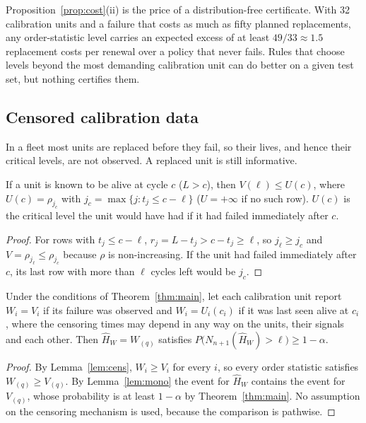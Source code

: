 Proposition~\ref{prop:cost}(ii) is the price of a distribution-free certificate. With 32 calibration units and a failure that costs as much as fifty planned replacements, any order-statistic level carries an expected excess of at least $49/33\approx 1.5$ replacement costs per renewal over a policy that never fails. Rules that choose levels beyond the most demanding calibration unit can do better on a given test set, but nothing certifies them.

\subsection{Censored calibration data}

In a fleet most units are replaced before they fail, so their lives, and hence their critical levels, are not observed. A replaced unit is still informative.

\begin{lemma}\label{lem:cens}
If a unit is known to be alive at cycle $c$ ($L>c$), then $V(\ell)\le U(c)$, where $U(c)=\rho_{j_c}$ with $j_c=\max\{j:t_j\le c-\ell\}$ ($U=+\infty$ if no such row). $U(c)$ is the critical level the unit would have had if it had failed immediately after $c$.
\end{lemma}
\begin{proof}
For rows with $t_j\le c-\ell$, $r_j=L-t_j>c-t_j\ge\ell$, so $j_\ell\ge j_c$ and $V=\rho_{j_\ell}\le\rho_{j_c}$ because $\rho$ is non-increasing. If the unit had failed immediately after $c$, its last row with more than $\ell$ cycles left would be $j_c$.
\end{proof}

\begin{theorem}\label{thm:cens}
Under the conditions of Theorem~\ref{thm:main}, let each calibration unit report $W_i=V_i$ if its failure was observed and $W_i=U_i(c_i)$ if it was last seen alive at $c_i$, where the censoring times may depend in any way on the units, their signals and each other. Then $\hat H_W=W_{(q)}$ satisfies $P\bigl(N_{n+1}(\hat H_W)>\ell\bigr)\ge 1-\alpha$.
\end{theorem}
\begin{proof}
By Lemma~\ref{lem:cens}, $W_i\ge V_i$ for every $i$, so every order statistic satisfies $W_{(q)}\ge V_{(q)}$. By Lemma~\ref{lem:mono} the event for $\hat H_W$ contains the event for $V_{(q)}$, whose probability is at least $1-\alpha$ by Theorem~\ref{thm:main}. No assumption on the censoring mechanism is used, because the comparison is pathwise.
\end{proof}

